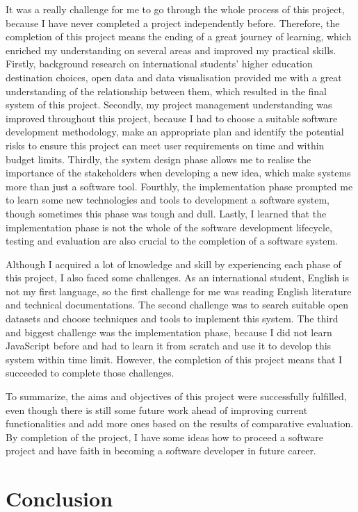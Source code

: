 It was a really challenge for me to go through the whole process of this project, because I have never completed a project independently before. Therefore, the completion of this project means the ending of a great journey of learning, which enriched my understanding on several areas and improved my practical skills. Firstly, background research on international students’ higher education destination choices, open data and data visualisation provided me with a great understanding of the relationship between them, which resulted in the final system of this project. Secondly, my project management understanding was improved throughout this project, because I had to choose a suitable software development methodology, make an appropriate plan and identify the potential risks to ensure this project can meet user requirements on time and within budget limits. Thirdly, the system design phase allows me to realise the importance of the stakeholders when developing a new idea, which make systems more than just a software tool. Fourthly, the implementation phase prompted me to learn some new technologies and tools to development a software system, though sometimes this phase was tough and dull. Lastly, I learned that the implementation phase is not the whole of the software development lifecycle, testing and evaluation are also crucial to the completion of a software system. 

Although I acquired a lot of knowledge and skill by experiencing each phase of this project, I also faced some challenges. As an international student, English is not my first language, so the first challenge for me was reading English literature and technical documentations. The second challenge was to search suitable open datasets and choose techniques and tools to implement this system. The third and biggest challenge was the implementation phase, because I did not learn JavaScript before and had to learn it from scratch and use it to develop this system within time limit.  However, the completion of this project means that I succeeded to complete those challenges.

To summarize, the aims and objectives of this project were successfully fulfilled, even though there is still some future work ahead of improving current functionalities and add more ones based on the results of comparative evaluation. By completion of the project, I have some ideas how to proceed a software project and have faith in becoming a software developer in future career.

\section{Conclusion}


